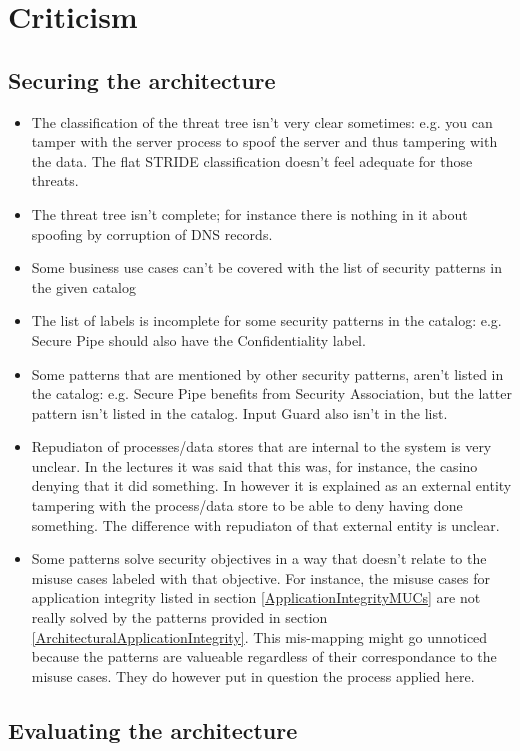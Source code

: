 \documentclass[a4paper,11pt]{report}
\begin{document}
\section{Criticism}
\label{Criticism}
\subsection{Securing the architecture}
\begin{itemize}
\item The classification of the threat tree isn't very clear sometimes: e.g. you can tamper with the server process
to spoof the server and thus tampering with the data. The flat STRIDE classification doesn't feel adequate for those threats.
\item The threat tree isn't complete; for instance there is nothing in it about spoofing by corruption of
DNS records.
\item Some business use cases can't be covered with the list of security patterns in the given catalog
\item The list of labels is incomplete for some security patterns in the catalog: e.g. Secure Pipe should also have
the Confidentiality label.
\item Some patterns that are mentioned by other security patterns, aren't listed in the catalog: e.g. Secure Pipe
benefits from Security Association, but the latter pattern isn't listed in the catalog. Input Guard also isn't
in the list.
\item Repudiaton of processes/data stores that are internal to the system is very unclear. In the lectures it was said that this was, for instance, the casino denying that it did something. In \cite[p270]{1202957} however it is explained as an external entity tampering with the process/data store to be able to deny having done something. The difference with repudiaton of that external entity is unclear.
\item Some patterns solve security objectives in a way that doesn't relate to the misuse cases labeled with that objective. For instance, the misuse cases for application integrity listed in section \ref{ApplicationIntegrityMUCs} are not really solved by the patterns provided in section \ref{ArchitecturalApplicationIntegrity}. This mis-mapping might go unnoticed because the patterns are valueable regardless of their correspondance to the misuse cases. They do however put in question the process applied here.
\end{itemize}

\subsection{Evaluating the architecture}
\end{document}
